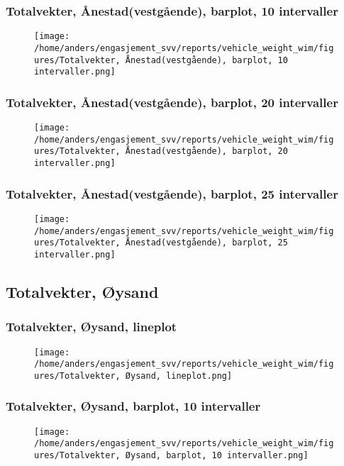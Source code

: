 \documentclass{article}
\begin{document}
\subsubsection{Totalvekter, Ånestad(vestgående), barplot, 10 intervaller}
\begin{figure}[H]
\centering
\texttt{[image: /home/anders/engasjement\_svv/reports/vehicle\_weight\_wim/figures/Totalvekter, Ånestad(vestgående), barplot, 10 intervaller.png]}
\end{figure}
\subsubsection{Totalvekter, Ånestad(vestgående), barplot, 20 intervaller}
\begin{figure}[H]
\centering
\texttt{[image: /home/anders/engasjement\_svv/reports/vehicle\_weight\_wim/figures/Totalvekter, Ånestad(vestgående), barplot, 20 intervaller.png]}
\end{figure}
\subsubsection{Totalvekter, Ånestad(vestgående), barplot, 25 intervaller}
\begin{figure}[H]
\centering
\texttt{[image: /home/anders/engasjement\_svv/reports/vehicle\_weight\_wim/figures/Totalvekter, Ånestad(vestgående), barplot, 25 intervaller.png]}
\end{figure}
\subsection{Totalvekter, Øysand}
\subsubsection{Totalvekter, Øysand, lineplot}
\begin{figure}[H]
\centering
\texttt{[image: /home/anders/engasjement\_svv/reports/vehicle\_weight\_wim/figures/Totalvekter, Øysand, lineplot.png]}
\end{figure}
\subsubsection{Totalvekter, Øysand, barplot, 10 intervaller}
\begin{figure}[H]
\centering
\texttt{[image: /home/anders/engasjement\_svv/reports/vehicle\_weight\_wim/figures/Totalvekter, Øysand, barplot, 10 intervaller.png]}
\end{figure}
\end{document}
